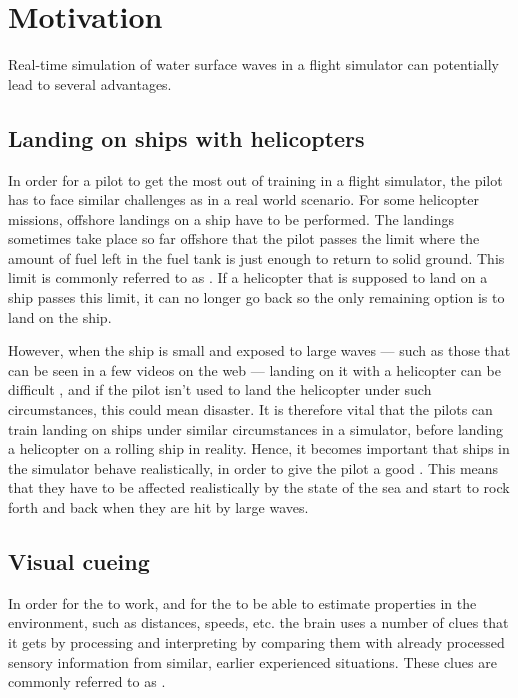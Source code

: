 \chapter{Motivation}
\label{chap:motivation}

Real-time simulation of water surface waves in a flight simulator can potentially lead to several advantages.

\section{Landing on ships with helicopters}

In order for a pilot to get the most out of training in a flight simulator, the pilot has to face similar challenges as in a real world scenario. For some helicopter missions, offshore landings on a ship have to be performed. The landings sometimes take place so far offshore that the pilot passes the limit where the amount of fuel left in the fuel tank is just enough to return to solid ground. This limit is commonly referred to as . If a helicopter that is supposed to land on a ship passes this limit, it can no longer go back so the only remaining option is to land on the ship.

However, when the ship is small and exposed to large waves --- such as those that can be seen in a few videos on the web \citep{MrOawal2009,PrismDefence2010,KopulaDK2010} --- landing on it with a helicopter can be difficult \citep{PrismDefence2010}, and if the pilot isn't used to land the helicopter under such circumstances, this could mean disaster. It is therefore vital that the pilots can train landing on ships under similar circumstances in a simulator, before landing a helicopter on a rolling ship in reality. Hence, it becomes important that ships in the simulator behave realistically, in order to give the pilot a good . This means that they have to be affected realistically by the state of the sea and start to rock forth and back when they are hit by large waves.

\section{Visual cueing}

In order for the  to work, and for the \brain to be able to estimate properties in the environment, such as distances, speeds, etc. the brain uses a number of clues that it gets by processing and interpreting  by comparing them with already processed sensory information from similar, earlier experienced situations. These clues are commonly referred to as .

